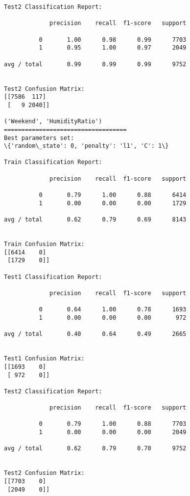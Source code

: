 \documentclass[11pt]{article}
\begin{document}
\begin{Verbatim}[commandchars=\\\{\}]
Test2 Classification Report:

             precision    recall  f1-score   support

          0       1.00      0.98      0.99      7703
          1       0.95      1.00      0.97      2049

avg / total       0.99      0.99      0.99      9752


Test2 Confusion Matrix:
[[7586  117]
 [   9 2040]]

('Weekend', 'HumidityRatio')
===================================
Best parameters set:
\{'random\_state': 0, 'penalty': 'l1', 'C': 1\}

Train Classification Report:

             precision    recall  f1-score   support

          0       0.79      1.00      0.88      6414
          1       0.00      0.00      0.00      1729

avg / total       0.62      0.79      0.69      8143


Train Confusion Matrix:
[[6414    0]
 [1729    0]]

Test1 Classification Report:

             precision    recall  f1-score   support

          0       0.64      1.00      0.78      1693
          1       0.00      0.00      0.00       972

avg / total       0.40      0.64      0.49      2665


Test1 Confusion Matrix:
[[1693    0]
 [ 972    0]]

Test2 Classification Report:

             precision    recall  f1-score   support

          0       0.79      1.00      0.88      7703
          1       0.00      0.00      0.00      2049

avg / total       0.62      0.79      0.70      9752


Test2 Confusion Matrix:
[[7703    0]
 [2049    0]]


    \end{Verbatim}
\end{document}
